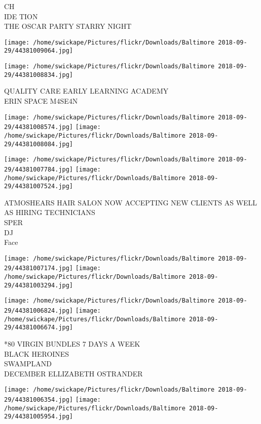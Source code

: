 \documentclass[10pt,letterpaper]{article}
\begin{document}
CH\\
IDE TION\\
THE OSCAR PARTY STARRY NIGHT\\
\pagebreak

\texttt{[image: /home/swickape/Pictures/flickr/Downloads/Baltimore 2018-09-29/44381009064.jpg]}

\vspace{0.25in}
\texttt{[image: /home/swickape/Pictures/flickr/Downloads/Baltimore 2018-09-29/44381008834.jpg]}

QUALITY CARE EARLY LEARNING ACADEMY\\
ERIN SPACE M4SE4N\\
\pagebreak

\texttt{[image: /home/swickape/Pictures/flickr/Downloads/Baltimore 2018-09-29/44381008574.jpg]}
\texttt{[image: /home/swickape/Pictures/flickr/Downloads/Baltimore 2018-09-29/44381008084.jpg]}

\texttt{[image: /home/swickape/Pictures/flickr/Downloads/Baltimore 2018-09-29/44381007784.jpg]}
\texttt{[image: /home/swickape/Pictures/flickr/Downloads/Baltimore 2018-09-29/44381007524.jpg]}

ATMOSHEARS HAIR SALON NOW ACCEPTING NEW CLIENTS AS WELL AS HIRING TECHNICIANS\\
SPER\\
DJ\\
Face\\
\pagebreak

\texttt{[image: /home/swickape/Pictures/flickr/Downloads/Baltimore 2018-09-29/44381007174.jpg]}
\texttt{[image: /home/swickape/Pictures/flickr/Downloads/Baltimore 2018-09-29/44381003294.jpg]}

\texttt{[image: /home/swickape/Pictures/flickr/Downloads/Baltimore 2018-09-29/44381006824.jpg]}
\texttt{[image: /home/swickape/Pictures/flickr/Downloads/Baltimore 2018-09-29/44381006674.jpg]}

*80 VIRGIN BUNDLES 7 DAYS A WEEK\\
BLACK HEROINES\\
SWAMPLAND\\
DECEMBER ELLIZABETH OSTRANDER\\
\pagebreak

\texttt{[image: /home/swickape/Pictures/flickr/Downloads/Baltimore 2018-09-29/44381006354.jpg]}
\texttt{[image: /home/swickape/Pictures/flickr/Downloads/Baltimore 2018-09-29/44381005954.jpg]}
\end{document}
